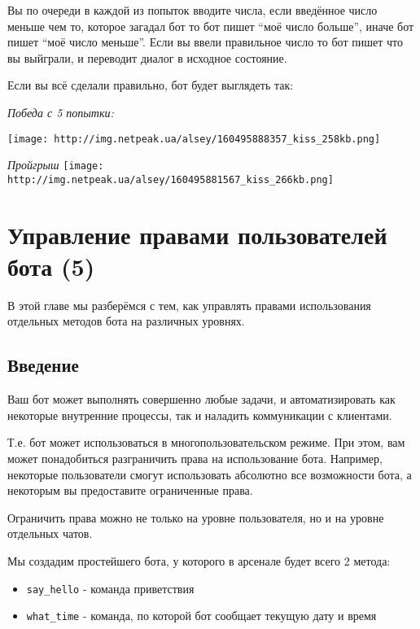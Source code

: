 \documentclass[
]{book}
\providecommand{\tightlist}{%
  \setlength{\itemsep}{0pt}\setlength{\parskip}{0pt}}
\begin{document}
Вы по очереди в каждой из попыток вводите числа, если введённое число меньше чем то, которое загадал бот то бот пишет ``моё число больше'', иначе бот пишет ``моё число меньше''. Если вы ввели правильное число то бот пишет что вы выйграли, и переводит диалог в исходное состояние.

Если вы всё сделали правильно, бот будет выглядеть так:

\emph{Победа с 5 попытки:}

\texttt{[image: http://img.netpeak.ua/alsey/160495888357\_kiss\_258kb.png]}

\emph{Пройгрыш}
\texttt{[image: http://img.netpeak.ua/alsey/160495881567\_kiss\_266kb.png]}

\hypertarget{ux443ux43fux440ux430ux432ux43bux435ux43dux438ux435-ux43fux440ux430ux432ux430ux43cux438-ux43fux43eux43bux44cux437ux43eux432ux430ux442ux435ux43bux435ux439-ux431ux43eux442ux430-5}{%
\chapter{Управление правами пользователей бота (5)}\label{ux443ux43fux440ux430ux432ux43bux435ux43dux438ux435-ux43fux440ux430ux432ux430ux43cux438-ux43fux43eux43bux44cux437ux43eux432ux430ux442ux435ux43bux435ux439-ux431ux43eux442ux430-5}}

В этой главе мы разберёмся с тем, как управлять правами использования отдельных методов бота на различных уровнях.

\hypertarget{ux432ux432ux435ux434ux435ux43dux438ux435-2}{%
\section{Введение}\label{ux432ux432ux435ux434ux435ux43dux438ux435-2}}

Ваш бот может выполнять совершенно любые задачи, и автоматизировать как некоторые внутренние процессы, так и наладить коммуникации с клиентами.

Т.е. бот может использоваться в многопользовательском режиме. При этом, вам может понадобиться разграничить права на использование бота. Например, некоторые пользователи смогут использовать абсолютно все возможности бота, а некоторым вы предоставите ограниченные права.

Ограничить права можно не только на уровне пользователя, но и на уровне отдельных чатов.

Мы создадим простейшего бота, у которого в арсенале будет всего 2 метода:

\begin{itemize}
\tightlist
\item
  \texttt{say\_hello} - команда приветствия
\item
  \texttt{what\_time} - команда, по которой бот сообщает текущую дату и время
\end{itemize}
\end{document}
